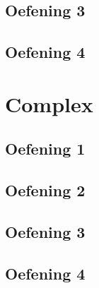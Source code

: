 \documentclass[a4paper,11pt]{report}
\begin{document}
\section{Oefening 3}

\section{Oefening 4}

\newpage

\chapter{Complex}
\section{Oefening 1}

\section{Oefening 2}

\section{Oefening 3}

\section{Oefening 4}

\newpage
\end{document}
